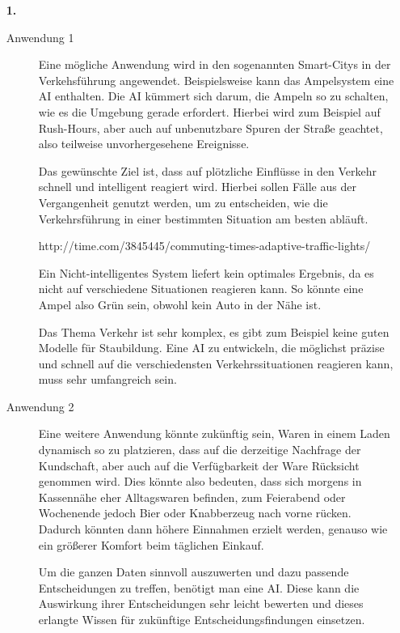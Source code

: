 \documentclass[a4paper,11pt]{article}
\author{\authorinfo}
\title{\titleinfo}
\date{\today}
\begin{document}
\maketitle
\begin{enumerate}
\item[\textbf{1.}]
    \begin{description}
    \item[Anwendung 1] 
        Eine mögliche Anwendung wird in den sogenannten Smart-Citys in der Verkehsführung angewendet. Beispielsweise kann das Ampelsystem eine AI enthalten. Die AI  kümmert sich darum, die Ampeln so zu schalten, wie es die Umgebung gerade erfordert. Hierbei wird zum Beispiel auf Rush-Hours, aber auch auf unbenutzbare Spuren der Straße geachtet, also teilweise unvorhergesehene Ereignisse.

        Das gewünschte Ziel ist, dass auf plötzliche Einflüsse in den Verkehr schnell und intelligent reagiert wird. Hierbei sollen Fälle aus der Vergangenheit genutzt werden, um zu entscheiden, wie die Verkehrsführung in einer bestimmten Situation am besten abläuft.

        http://time.com/3845445/commuting-times-adaptive-traffic-lights/

        Ein Nicht-intelligentes System liefert kein optimales Ergebnis, da es nicht auf verschiedene Situationen reagieren kann. So könnte eine Ampel also Grün sein, obwohl kein Auto in der Nähe ist.

        Das Thema Verkehr ist sehr komplex, es gibt zum Beispiel keine guten Modelle für Staubildung.
        Eine AI zu entwickeln, die möglichst präzise und schnell auf die verschiedensten Verkehrssituationen reagieren kann, muss sehr umfangreich sein.


    \item[Anwendung 2]
        Eine weitere Anwendung könnte zukünftig sein, Waren in einem Laden dynamisch so zu platzieren, dass auf die derzeitige Nachfrage der Kundschaft, aber auch auf die Verfügbarkeit der Ware Rücksicht genommen wird.
        Dies könnte also bedeuten, dass sich morgens in Kassennähe eher Alltagswaren befinden, zum Feierabend oder Wochenende jedoch Bier oder Knabberzeug nach vorne rücken.
        Dadurch könnten dann höhere Einnahmen erzielt werden, genauso wie ein größerer Komfort beim täglichen Einkauf.

        Um die ganzen Daten sinnvoll auszuwerten und dazu passende Entscheidungen zu treffen, benötigt man eine AI.
        Diese kann die Auswirkung ihrer Entscheidungen sehr leicht bewerten und dieses erlangte Wissen für zukünftige Entscheidungsfindungen einsetzen.


\end{description}
\end{enumerate}
\end{document}
